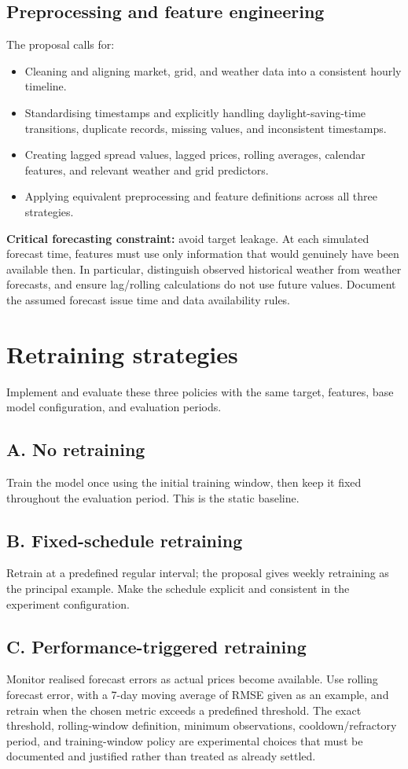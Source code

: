 \documentclass[11pt,a4paper]{article}
\begin{document}
\subsection{Preprocessing and feature engineering}
The proposal calls for:
\begin{itemize}
  \item Cleaning and aligning market, grid, and weather data into a consistent hourly timeline.
  \item Standardising timestamps and explicitly handling daylight-saving-time transitions, duplicate records, missing values, and inconsistent timestamps.
  \item Creating lagged spread values, lagged prices, rolling averages, calendar features, and relevant weather and grid predictors.
  \item Applying equivalent preprocessing and feature definitions across all three strategies.
\end{itemize}
\textbf{Critical forecasting constraint:} avoid target leakage. At each simulated forecast time, features must use only information that would genuinely have been available then. In particular, distinguish observed historical weather from weather forecasts, and ensure lag/rolling calculations do not use future values. Document the assumed forecast issue time and data availability rules.

\section{Retraining strategies}
Implement and evaluate these three policies with the same target, features, base model configuration, and evaluation periods.

\subsection{A. No retraining}
Train the model once using the initial training window, then keep it fixed throughout the evaluation period. This is the static baseline.

\subsection{B. Fixed-schedule retraining}
Retrain at a predefined regular interval; the proposal gives weekly retraining as the principal example. Make the schedule explicit and consistent in the experiment configuration.

\subsection{C. Performance-triggered retraining}
Monitor realised forecast errors as actual prices become available. Use rolling forecast error, with a 7-day moving average of RMSE given as an example, and retrain when the chosen metric exceeds a predefined threshold. The exact threshold, rolling-window definition, minimum observations, cooldown/refractory period, and training-window policy are experimental choices that must be documented and justified rather than treated as already settled.
\end{document}
